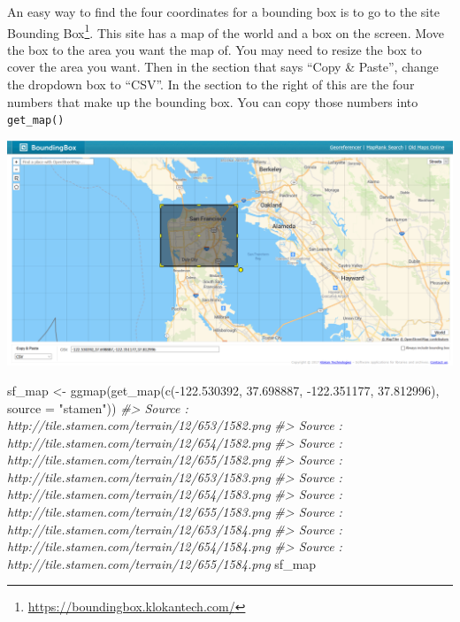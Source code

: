 \documentclass[
]{krantz}
\makeatletter
\newenvironment{Shaded}{\begin{snugshade}}{\end{snugshade}}
\newcommand{\AttributeTok}[1]{\textcolor[rgb]{0.61,0.61,0.61}{#1}}
\newcommand{\CommentTok}[1]{\textcolor[rgb]{0.37,0.37,0.37}{\textit{#1}}}
\newcommand{\FloatTok}[1]{\textcolor[rgb]{0.06,0.06,0.06}{#1}}
\newcommand{\FunctionTok}[1]{\textcolor[rgb]{0,0,0}{#1}}
\newcommand{\NormalTok}[1]{#1}
\newcommand{\OtherTok}[1]{\textcolor[rgb]{0.37,0.37,0.37}{#1}}
\newcommand{\SpecialCharTok}[1]{\textcolor[rgb]{0,0,0}{#1}}
\newcommand{\StringTok}[1]{\textcolor[rgb]{0.5,0.5,0.5}{#1}}
\renewcommand{\href}[2]{#2\footnote{\url{#1}}}
\newenvironment{kframe}{%
\medskip{}
\setlength{\fboxsep}{.8em}
 \def\at@end@of@kframe{}%
 \ifinner\ifhmode%
  \def\at@end@of@kframe{\end{minipage}}%
  \begin{minipage}{\columnwidth}%
 \fi\fi%
 \def\FrameCommand##1{\hskip\@totalleftmargin \hskip-\fboxsep
 \colorbox{shadecolor}{##1}\hskip-\fboxsep
     \hskip-\linewidth \hskip-\@totalleftmargin \hskip\columnwidth}%
 \MakeFramed {\advance\hsize-\width
   \@totalleftmargin\z@ \linewidth\hsize
   \@setminipage}}%
 {\par\unskip\endMakeFramed%
 \at@end@of@kframe}
\renewenvironment{Shaded}{\begin{kframe}}{\end{kframe}}
\makeatother
\begin{document}
An easy way to find the four coordinates for a bounding box is to go to the site \href{https://boundingbox.klokantech.com/}{Bounding Box}. This site has a map of the world and a box on the screen. Move the box to the area you want the map of. You may need to resize the box to cover the area you want. Then in the section that says ``Copy \& Paste'', change the dropdown box to ``CSV''. In the section to the right of this are the four numbers that make up the bounding box. You can copy those numbers into \texttt{get\_map()}

\includegraphics{images/bounding_box.PNG}

\begin{Shaded}
\begin{Highlighting}[]
\NormalTok{sf\_map }\OtherTok{\textless{}{-}} \FunctionTok{ggmap}\NormalTok{(}\FunctionTok{get\_map}\NormalTok{(}\FunctionTok{c}\NormalTok{(}\SpecialCharTok{{-}}\FloatTok{122.530392}\NormalTok{, }\FloatTok{37.698887}\NormalTok{, }\SpecialCharTok{{-}}\FloatTok{122.351177}\NormalTok{,}
  \FloatTok{37.812996}\NormalTok{), }\AttributeTok{source =} \StringTok{"stamen"}\NormalTok{))}
\CommentTok{\#\textgreater{} Source : http://tile.stamen.com/terrain/12/653/1582.png}
\CommentTok{\#\textgreater{} Source : http://tile.stamen.com/terrain/12/654/1582.png}
\CommentTok{\#\textgreater{} Source : http://tile.stamen.com/terrain/12/655/1582.png}
\CommentTok{\#\textgreater{} Source : http://tile.stamen.com/terrain/12/653/1583.png}
\CommentTok{\#\textgreater{} Source : http://tile.stamen.com/terrain/12/654/1583.png}
\CommentTok{\#\textgreater{} Source : http://tile.stamen.com/terrain/12/655/1583.png}
\CommentTok{\#\textgreater{} Source : http://tile.stamen.com/terrain/12/653/1584.png}
\CommentTok{\#\textgreater{} Source : http://tile.stamen.com/terrain/12/654/1584.png}
\CommentTok{\#\textgreater{} Source : http://tile.stamen.com/terrain/12/655/1584.png}
\NormalTok{sf\_map}
\end{Highlighting}
\end{Shaded}
\end{document}
